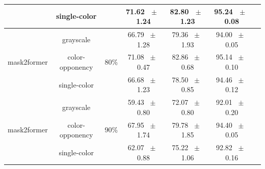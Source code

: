 \begin{table}[h]
\begin{tabular}{@{}lccc ccc@{}}
    & single-color & & 71.62 ~$\pm$~ 1.24 & 82.80 ~$\pm$~ 1.23 & 95.24 ~$\pm$~ 0.08 \\
    \midrule
    \multirow{3}{*}{mask2former} & grayscale & \multirow{3}{*}{80\%} & 66.79 ~$\pm$~ 1.28 & 79.36 ~$\pm$~ 1.93 & 94.00 ~$\pm$~ 0.05 \\
    & color-opponency & & 71.08 ~$\pm$~ 0.47 & 82.86 ~$\pm$~ 0.68 & 95.14 ~$\pm$~ 0.10 \\
    & single-color & & 66.68 ~$\pm$~ 1.23 & 78.50 ~$\pm$~ 0.85 & 94.46 ~$\pm$~ 0.12 \\
    \midrule
    \multirow{3}{*}{mask2former} & grayscale & \multirow{3}{*}{90\%} & 59.43 ~$\pm$~ 0.80 & 72.07 ~$\pm$~ 0.80 & 92.01 ~$\pm$~ 0.20 \\
    & color-opponency & & 67.95 ~$\pm$~ 1.74 & 79.78 ~$\pm$~ 1.85 & 94.40 ~$\pm$~ 0.05 \\
    & single-color & & 62.07 ~$\pm$~ 0.88 & 75.22 ~$\pm$~ 1.06 & 92.82 ~$\pm$~ 0.16 \\
    \midrule
    \bottomrule
  \end{tabular}
  \label{tab:sparse_mask2former_cityscapes}
\end{table}